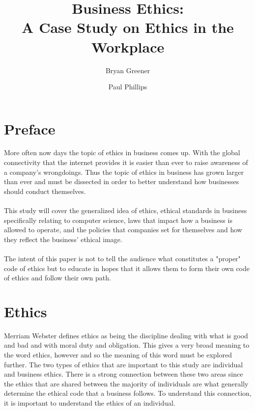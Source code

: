 \documentclass[a4paper,12pt]{article}
\author{Bryan Greener \and Paul Phillips}
\title{Business Ethics:\\A Case Study on Ethics in the Workplace}
\newcommand{\mychapter}[2]{
	\setcounter{chapter}{#1}
	\setcounter{section}{0}
	\chapter*{#2}
	\addcontentsline{toc}{chapter}{#2}
}
\begin{document}
\maketitle

\pagebreak
\section*{Preface}
\paragraph{}More often now days the topic of ethics in business comes up. With the global connectivity that the internet provides it is easier than ever to raise awareness of a company's wrongdoings. Thus the topic of ethics in business has grown larger than ever and must be dissected in order to better understand how businesses should conduct themselves.

\paragraph{}This study will cover the generalized idea of ethics, ethical standards in business specifically relating to computer science, laws that impact how a business is allowed to operate, and the policies that companies set for themselves and how they reflect the business' ethical image.

\paragraph{}The intent of this paper is not to tell the audience what constitutes a "proper" code of ethics but to educate in hopes that it allows them to form their own code of ethics and follow their own path.

\section*{Ethics}
\paragraph{}Merriam Webster defines ethics as being the discipline dealing with what is good and bad and with moral duty and obligation. This gives a very broad meaning to the word ethics, however and so the meaning of this word must be explored further. The two types of ethics that are important to this study are individual and business ethics. There is a strong connection between these two areas since the ethics that are shared between the majority of individuals are what generally determine the ethical code that a business follows. To understand this connection, it is important to understand the ethics of an individual.
\end{document}
